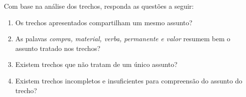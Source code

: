 

\vspace{0.5 cm} 
\noindent Com base na análise dos trechos, responda as questões a seguir:
\vspace{0.5 cm} 


\begin{enumerate}



\item Os trechos apresentados compartilham um mesmo assunto?
\likertB




\item As palavas \textit{compra, material, verba, permanente e valor} resumem bem o assunto tratado nos trechos?
\likertB




\item Existem trechos que não tratam de um único assunto?
\likertA



\item Existem trechos incompletos e insuficientes para compreensão do assunto do trecho?
\likertA



\end{enumerate}





%
%
%
%
%

















